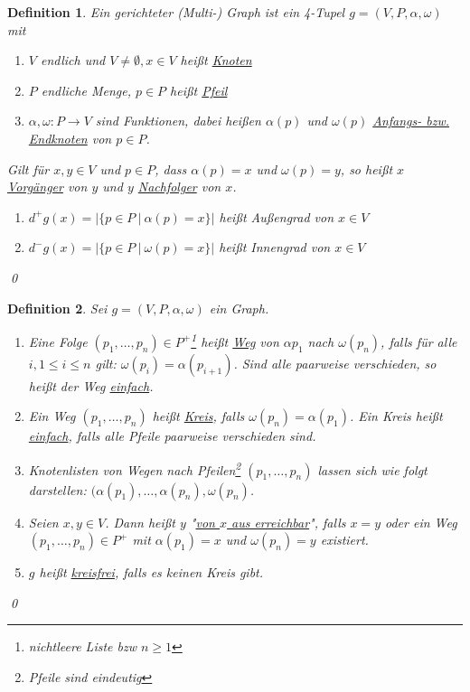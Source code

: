 \documentclass[ngerman]{scrartcl}
\theoremstyle{custom}
\newtheorem{mdef}{Definition} \numberwithin{mdef}{subsection}
\newcommand{\0}{\mathbf{0}}
\newcommand{\1}{\mathbf{L}}
\begin{document}
\begin{mdef}
Ein gerichteter (Multi-) Graph ist ein 4-Tupel $g=(V,P,\alpha,
\omega)$ mit 
\begin{enumerate}
\item[(1)] $V$ endlich und $V \not = \emptyset, x \in V$ hei\ss t
  \underline{Knoten}
\item[(2)] $P$ endliche Menge, $p \in P$ hei\ss t \underline{Pfeil}
\item[(3)] $\alpha, \omega: P \rightarrow V$ sind Funktionen, dabei
  hei\ss en $\alpha(p)$ und $\omega(p)$ \underline{Anfangs- bzw. Endknoten} von $p
  \in P$.
\end{enumerate}
Gilt f\"ur $x,y \in V$ und $p \in P$, dass $\alpha(p) = x$ und
$\omega(p)=y$, so hei\ss t $x$ \underline{Vorg\"anger} von $y$ und $y$ \underline{Nachfolger}
von $x$.\\
\begin{enumerate}
\item[(4)] $d^{+}g(x) = \vert \{ p \in P ~\vert~ \alpha(p)=x\}\vert$
  hei\ss t Au\ss engrad von $x \in V$
\item[(5)] $d^{-}g(x) = \vert \{ p \in P ~\vert~ \omega(p)=x\}\vert$
  hei\ss t Innengrad von $x \in V$
\end{enumerate}
\qed
\end{mdef}

\begin{mdef}
Sei $g=(V,P,\alpha, \omega)$ ein Graph.
\begin{enumerate}
\item[(1)] Eine Folge $(p_1,\dots,p_n) \in P^+$\footnote{nichtleere
    Liste bzw $n \geq 1$} hei\ss t \underline{Weg} von $\alpha{p_1}$
  nach $\omega(p_n)$, falls f\"ur alle $i, 1 \leq i \leq n$ gilt:
  $\omega(p_i) = \alpha(p_{i+1})$. Sind alle paarweise verschieden, so
  hei\ss t der Weg \underline{einfach}.
\item[(2)] Ein Weg $(p_1, \dots, p_n)$ hei\ss t \underline{Kreis}, falls
  $\omega(p_n) = \alpha(p_1)$. Ein Kreis hei\ss t \underline{einfach},
  falls alle Pfeile paarweise verschieden sind.
\item[(3)] Knotenlisten von Wegen nach Pfeilen\footnote{Pfeile sind
    eindeutig} $(p_1, \dots, p_n)$ lassen sich wie folgt darstellen:
  $(\alpha(p_1),\dots, \alpha(p_n), \omega(p_n)$.
\item[(4)] Seien $x, y \in V$. Dann hei\ss t $y$ "\underline{von $x$
    aus erreichbar}", falls $x=y$ oder ein Weg $(p_1, \dots, p_n) \in
  P^+$ mit $\alpha(p_1) = x$ und $\omega(p_n) = y$ existiert.
\item[(5)] $g$ hei\ss t \underline{kreisfrei}, falls es keinen Kreis
  gibt.
\end{enumerate}
\qed 
\end{mdef}
\end{document}
